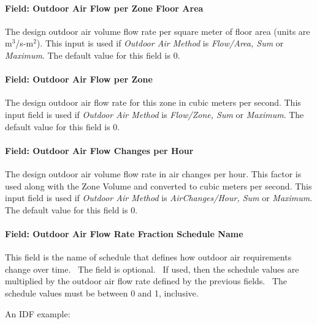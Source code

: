 \paragraph{Field: Outdoor Air Flow per Zone Floor Area}\label{field-outdoor-air-flow-per-zone-floor-area}

The design outdoor air volume flow rate per square meter of floor area (units are m\(^{3}\)/s-m\(^{2}\)). This input is used if \emph{Outdoor Air Method} is \emph{Flow/Area, Sum} or \emph{Maximum}. The default value for this field is 0.

\paragraph{Field: Outdoor Air Flow per Zone}\label{field-outdoor-air-flow-per-zone}

The design outdoor air flow rate for this zone in cubic meters per second. This input field is used if \emph{Outdoor Air Method} is \emph{Flow/Zone, Sum} or \emph{Maximum}. The default value for this field is 0.

\paragraph{Field: Outdoor Air Flow Changes per Hour}\label{field-outdoor-air-flow-changes-per-hour}

The design outdoor air volume flow rate in air changes per hour. This factor is used along with the Zone Volume and converted to cubic meters per second. This input field is used if \emph{Outdoor Air Method} is \emph{AirChanges/Hour, Sum} or \emph{Maximum}. The default value for this field is 0.

\paragraph{Field: Outdoor Air Flow Rate Fraction Schedule Name}\label{field-outdoor-air-flow-rate-fraction-schedule-name}

This field is the name of schedule that defines how outdoor air requirements change over time.~ The field is optional.~ If used, then the schedule values are multiplied by the outdoor air flow rate defined by the previous fields.~ The schedule values must be between 0 and 1, inclusive.

An IDF example:

